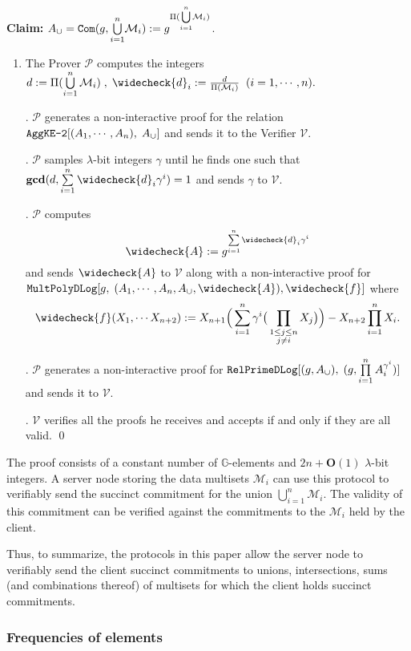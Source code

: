 \documentclass[11pt, lettersize, notitlepage, leqno, footskip=0.6cm]{article}
\newcommand{\pl}{\prod\limits}
\newcommand{\slim}{\sum\limits}
\newcommand{\ttt}{\texttt}
\newcommand{\bG}{\mathbb{G}}
\newcommand{\mc}{\mathcal}
\newcommand{\mbf}{\mathbf}
\newcommand{\lam}{\lambda}
\newcommand{\weck}{\widecheck}
\newcommand{\bO}{\mbf{O}}
\newcommand{\mP}{\mc{P}}
\newcommand{\V}{\mc{V}}
\newcommand{\mcM}{\mc{M}}
\newcommand{\vs}{\vspace{-0.15cm}}
\newcommand{\noin}{\noindent}
\newcommand{\GCD}{\mbf{gcd}}
\numberwithin{equation}{section}
\begin{document}
\noin \textbf{Claim:} $A_{\tt{\cup}} = \protect{\verb|Com|}(g, {\bigcup\limits_{i=1}^n} \mc{M}_i) := g^{\Pi({\bigcup\limits_{i=1}^n} \mc{M}_i)}$.

\begin{enumerate}[wide, labelwidth=!, labelindent=0pt]\vs \item The Prover $\mP$ computes the integers $d:= \Pi(\bigcup\limits_{i=1}^n \mc{M}_i)\;,\;\weck{d}_i:= \frac{d}{\Pi(\mcM_i)}\;\;(i=1,\cdots,n).$

\noin 2. $\mP$ generates a non-interactive proof for the relation $\ttt{AggKE-2}[(A_1,\cdots,A_n),\;A_{\tt{\cup}}]$ and sends it to the Verifier $\V$.


\noin 3. $\mP$ samples $\lam$-bit integers $\gamma$ until he finds one such that $ \GCD(d, \slim_{i=1}^n \weck{d}_i\gamma^i) =1$ and sends $\gamma$ to $\V$.

\noin 4. $\mP$ computes \vs $$\weck{A}:= g^{\slim_{i=1}^n \weck{d}_i\gamma^i}$$ and sends $\weck{A}$ to $\V$ along with a non-interactive proof for $\ttt{MultPolyDLog}[g,\;(A_1,\cdots, A_n, A_{\tt{\cup}}, \weck{A}), \weck{f}]$ where \vs $$\weck{f}(X_1,\cdots X_{n+2}):= X_{n+1}\Big(\slim_{i=1}^n \gamma^i\big(\pl_{\substack{1\leq j\leq n\\ j\neq i}} X_j\big)\Big) - X_{n+2}\pl_{i=1}^n X_i.$$\vs

\noin 5. $\mP$ generates a non-interactive proof for $\ttt{RelPrimeDLog}[(g, A_{\tt{\cup}}),\;(g, \pl_{i=1}^n A_i^{\gamma^i})]$ and sends it to $\V$.

\noin 6. $\V$ verifies all the proofs he receives and accepts if and only if they are all valid. \qed \end{enumerate}

\noin The proof consists of a constant number of $\bG$-elements and $2n+\bO(1)$ $\lam$-bit integers. A server node storing the data multisets $\mcM_i$ can use this protocol to verifiably send the succinct commitment for the union $\bigcup\limits_{i=1}^n \mcM_i$. The validity of this commitment can be verified against the commitments to the $\mcM_i$ held by the client.

\vspace{0.2cm}

Thus, to summarize, the protocols in this paper allow the server node to verifiably send the client succinct commitments to unions, intersections, sums (and combinations thereof) of multisets for which the client holds succinct commitments.  

\subsubsection{\fontsize{11}{11} \selectfont Frequencies of elements}
\end{document}
